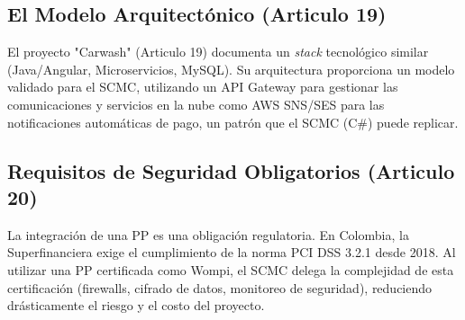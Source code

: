 \subsection{El Modelo Arquitectónico (Articulo 19)}
El proyecto "Carwash" (Articulo 19) documenta un \textit{stack} tecnológico similar (Java/Angular, Microservicios, MySQL). Su arquitectura proporciona un modelo validado para el SCMC, utilizando un API Gateway para gestionar las comunicaciones y servicios en la nube como AWS SNS/SES para las notificaciones automáticas de pago, un patrón que el SCMC (C\#) puede replicar.

\subsection{Requisitos de Seguridad Obligatorios (Articulo 20)}
La integración de una PP es una obligación regulatoria. En Colombia, la Superfinanciera exige el cumplimiento de la norma PCI DSS 3.2.1 desde 2018. Al utilizar una PP certificada como Wompi, el SCMC delega la complejidad de esta certificación (firewalls, cifrado de datos, monitoreo de seguridad), reduciendo drásticamente el riesgo y el costo del proyecto.